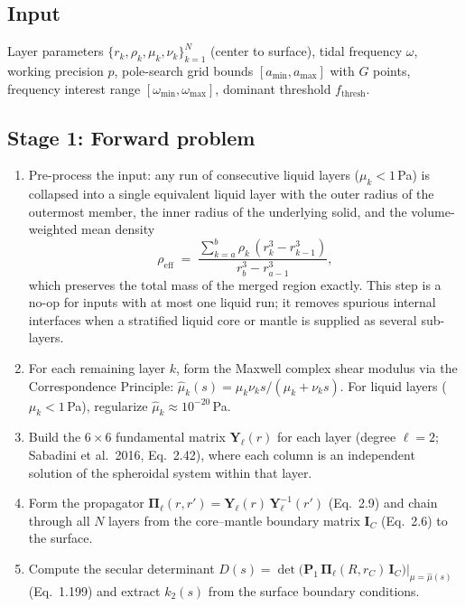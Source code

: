 \documentclass[11pt]{article}
\begin{document}
\subsection*{Input}
Layer parameters $\{r_k, \rho_k, \mu_k, \nu_k\}_{k=1}^{N}$
(center to surface), tidal frequency $\omega$, working precision
$p$, pole-search grid bounds $[a_{\min}, a_{\max}]$ with $G$ points,
frequency interest range $[\omega_{\min}, \omega_{\max}]$, dominant
threshold $f_{\mathrm{thresh}}$.

\subsection*{Stage 1: Forward problem}

\begin{enumerate}[leftmargin=2em]
  \item Pre-process the input: any run of consecutive liquid layers
    ($\mu_k < 1$\,Pa) is collapsed into a single equivalent liquid
    layer with the outer radius of the outermost member, the inner
    radius of the underlying solid, and the volume-weighted mean
    density
    \[
      \rho_{\mathrm{eff}} \;=\;
      \frac{\sum_{k=a}^{b} \rho_k\,(r_k^3 - r_{k-1}^3)}
           {r_b^3 - r_{a-1}^3},
    \]
    which preserves the total mass of the merged region exactly. This
    step is a no-op for inputs with at most one liquid run; it removes
    spurious internal interfaces when a stratified liquid core or
    mantle is supplied as several sub-layers.

  \item For each remaining layer $k$, form the Maxwell complex shear
    modulus via the Correspondence Principle:
    $\hat\mu_k(s) = \mu_k \nu_k s / (\mu_k + \nu_k s)$.
    For liquid layers ($\mu_k < 1$\,Pa), regularize
    $\hat\mu_k \approx 10^{-20}$\,Pa.

  \item Build the $6\times6$ fundamental matrix
    $\mathbf{Y}_\ell(r)$ for each layer
    (degree $\ell = 2$; Sabadini et al.\ 2016, Eq.~2.42),
    where each column is an independent solution of the
    spheroidal system within that layer.

  \item Form the propagator
    $\mathbf{\Pi}_\ell(r, r') =
    \mathbf{Y}_\ell(r)\,\mathbf{Y}_\ell^{-1}(r')$ (Eq.~2.9)
    and chain through all $N$ layers from the core--mantle boundary
    matrix $\mathbf{I}_C$ (Eq.~2.6) to the surface.

  \item Compute the secular determinant
    $D(s) = \det\bigl(\mathbf{P}_1\,\mathbf{\Pi}_\ell(R, r_C)\,
    \mathbf{I}_C\bigr)\big|_{\mu=\hat\mu(s)}$ (Eq.~1.199) and
    extract $k_2(s)$ from the surface boundary conditions.
\end{enumerate}
\end{document}
